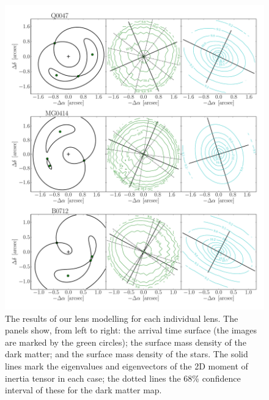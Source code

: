 \documentclass[useAMS,usenatbib]{mn2e}
\begin{document}
\begin{figure}
  \centering
  \includegraphics[width=.8\linewidth]{Figures/AllLenses31.pdf}
  \caption[width=.65\linewidth]{The results of our lens modelling for each individual lens. The panels show, from left to right: the arrival time surface (the images are marked by the green circles); the surface mass density of the dark matter; and the surface mass density of the stars. The solid lines mark the eigenvalues and eigenvectors of the 2D moment of inertia tensor in each case; the dotted lines the 68\% confidence interval of these for the dark matter map.}
  \label{fig:lensreconstruction1}
\end{figure}
\end{document}
